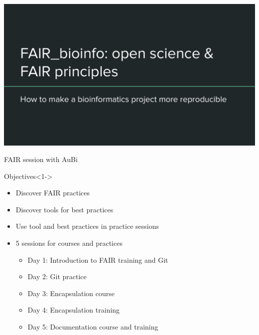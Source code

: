 \begin{frame}
\includegraphics[page=13,scale=0.6]{01_OS_and_FAIR_intro.pdf}
\end{frame}


\begin{frame}{FAIR session with AuBi}

\begin{block}{Objectives}<1->
\begin{itemize}
\item Discover FAIR practices
\item Discover tools for best practices
\item Use tool and best practices in practice sessions
\item 5 sessions for courses and practices
	\begin{itemize}
	\item Day 1: Introduction to FAIR training and Git
	\item Day 2: Git practice
	\item Day 3: Encapsulation course
	\item Day 4: Encapsulation training
	\item Day 5: Documentation course and training
	\end{itemize}
\end{itemize}
\end{block}
\end{frame}
